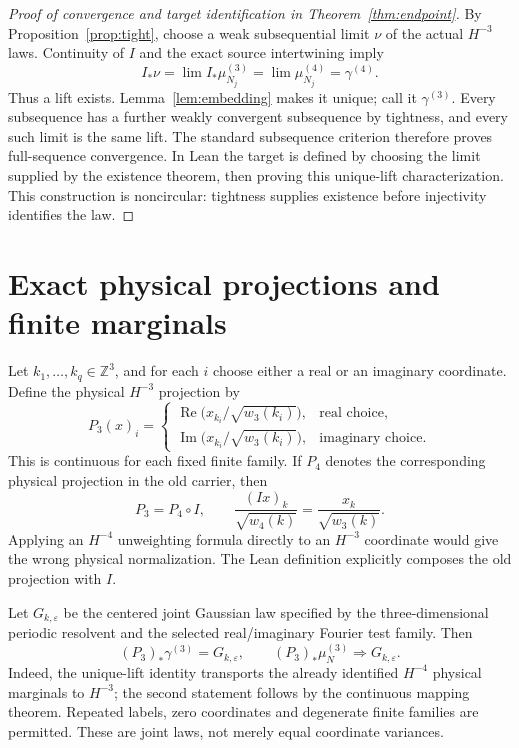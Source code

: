 \documentclass[11pt]{amsart}
\theoremstyle{remark}\newtheorem{remark}[theorem]{Remark}
\newcommand{\Z}{\mathbb Z}\newcommand{\E}{\mathbb E}
\begin{document}
\begin{proof}[Proof of convergence and target identification in Theorem~\ref{thm:endpoint}]
By Proposition~\ref{prop:tight}, choose a weak subsequential limit $\nu$ of the actual $H^{-3}$ laws. Continuity of $I$ and the exact source intertwining imply
\[
 I_*\nu=\lim I_*\mu_{N_j}^{(3)}
 =\lim\mu_{N_j}^{(4)}=\gamma^{(4)}.
\]
Thus a lift exists. Lemma~\ref{lem:embedding} makes it unique; call it $\gamma^{(3)}$. Every subsequence has a further weakly convergent subsequence by tightness, and every such limit is the same lift. The standard subsequence criterion therefore proves full-sequence convergence. In Lean the target is defined by choosing the limit supplied by the existence theorem, then proving this unique-lift characterization. This construction is noncircular: tightness supplies existence before injectivity identifies the law.
\end{proof}

\section{Exact physical projections and finite marginals}
Let $k_1,\ldots,k_q\in\Z^3$, and for each $i$ choose either a real or an imaginary coordinate. Define the physical $H^{-3}$ projection by
\begin{equation}\label{eq:projection}
 P_3(x)_i=
 \begin{cases}
 \operatorname{Re}\bigl(x_{k_i}/\sqrt{w_3(k_i)}\bigr),&\text{real choice},\\
 \operatorname{Im}\bigl(x_{k_i}/\sqrt{w_3(k_i)}\bigr),&\text{imaginary choice}.
 \end{cases}
\end{equation}
This is continuous for each fixed finite family. If $P_4$ denotes the corresponding physical projection in the old carrier, then
\[
 P_3=P_4\circ I,\qquad
 \frac{(Ix)_k}{\sqrt{w_4(k)}}
 =\frac{x_k}{\sqrt{w_3(k)}}.
\]
Applying an $H^{-4}$ unweighting formula directly to an $H^{-3}$ coordinate would give the wrong physical normalization. The Lean definition explicitly composes the old projection with $I$.

Let $G_{k,\varepsilon}$ be the centered joint Gaussian law specified by the three-dimensional periodic resolvent and the selected real/imaginary Fourier test family. Then
\begin{equation}\label{eq:marginals}
 (P_3)_*\gamma^{(3)}=G_{k,\varepsilon},\qquad
 (P_3)_*\mu_N^{(3)}\Longrightarrow G_{k,\varepsilon}.
\end{equation}
Indeed, the unique-lift identity transports the already identified $H^{-4}$ physical marginals to $H^{-3}$; the second statement follows by the continuous mapping theorem. Repeated labels, zero coordinates and degenerate finite families are permitted. These are joint laws, not merely equal coordinate variances.
\end{document}
